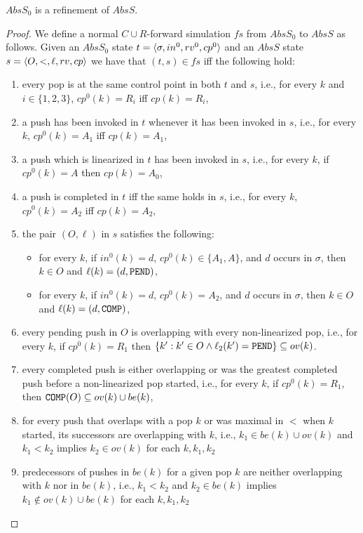 \begin{lemma} 
$AbsS_0$ is a refinement of $AbsS$.
\end{lemma}
\begin{proof}
We define a normal $C\cup R$-forward simulation $fs$ from $AbsS_0$ to $AbsS$ as follows. Given an $AbsS_0$ state $t=\langle {\sigma,in^0,rv^0,cp^0} \rangle$ and an $AbsS$ state $s=\langle {O,<,\ell,rv,cp} \rangle$ we have that $(t,s)\in fs$ iff the following hold:
\begin{enumerate}
	\item every pop is at the same control point in both $t$ and $s$, i.e., for every $k$ and $i\in \{1,2,3\}$, $cp^0(k)=R_i$ iff $cp(k)=R_i$,
	\item a push has been invoked in $t$ whenever it has been invoked in $s$, i.e., for every $k$, $cp^0(k)=A_1$ iff $cp(k)=A_1$,
	\item a push which is linearized in $t$ has been invoked in $s$, i.e., for every $k$, if $cp^0(k)=A$ then $cp(k)=A_0$,
	\item a push is completed in $t$ iff the same holds in $s$, i.e., for every $k$, $cp^0(k)=A_2$ iff $cp(k)=A_2$,
	\item the pair $(O,\ell)$ in $s$ satisfies the following:
	\begin{itemize}
		\item for every $k$, if $in^0(k)=d$, $cp^0(k)\in \{A_1,A\}$, and $d$ occurs in $\sigma$, then $k\in O$ and $\ell(k)=(d,{\tt PEND})$,
		\item for every $k$, if $in^0(k)=d$, $cp^0(k) = A_2$, and $d$ occurs in $\sigma$, then $k\in O$ and $\ell(k)=(d,{\tt COMP})$,
	\end{itemize}
	\item every pending push in $O$ is overlapping with every non-linearized pop, i.e., for every $k$, if $cp^0(k)=R_1$ then $\{k': k'\in O\land \ell_2(k')={\tt PEND}\}\subseteq ov(k)$.
	\item every completed push is either overlapping or was the greatest completed push before a non-linearized pop started, i.e., for every $k$, if $cp^0(k)=R_1$, then ${\tt COMP}(O)\subseteq ov(k)\cup be(k)$,
	\item for every push that overlaps with a pop $k$ or was maximal in $<$ when $k$ started, its successors are overlapping with $k$, i.e., $k_1\in be(k)\cup ov(k)$ and $k_1 < k_2$ implies $k_2 \in ov(k)$ for each $k, k_1, k_2$
	\item predecessors of pushes in $be(k)$ for a given pop $k$ are neither overlapping with $k$ nor in $be(k)$, i.e., $k_1 < k_2$ and $k_2\in be(k)$ implies $k_1\not\in ov(k)\cup be(k)$ for each $k,k_1,k_2$

\end{enumerate}
\end{proof}
